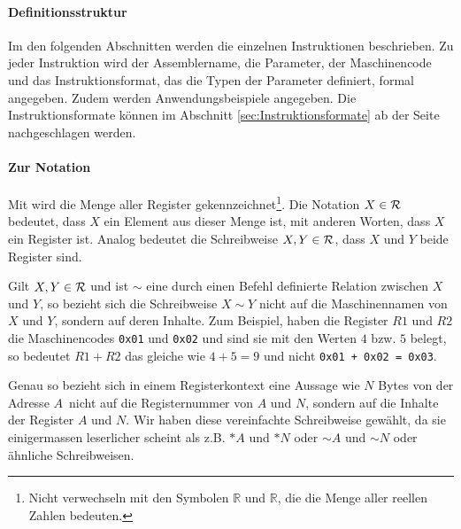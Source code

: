 \paragraph{Definitionsstruktur}
Im den folgenden Abschnitten werden die einzelnen Instruktionen beschrieben. Zu
jeder Instruktion wird der \gls{Assemblername}, die Parameter, der Maschinencode
und das Instruktionsformat, das die Typen der Parameter definiert, formal
angegeben. Zudem werden Anwendungsbeispiele angegeben. Die Instruktionsformate
können im Abschnitt \ref{sec:Instruktionsformate} ab der Seite
\pageref{sec:Instruktionsformate} nachgeschlagen werden.

\paragraph{Zur Notation}
Mit \Reg\index{\Reg} wird die Menge aller Register
gekennzeichnet\footnote{Nicht verwechseln mit den Symbolen $\mathds{R}$ und
$\mathbb{R}$, die die Menge aller reellen Zahlen bedeuten.}.
Die Notation $X \in \mathcal{R}$ bedeutet, dass $X$ ein Element aus dieser Menge ist,
mit anderen Worten, dass $X$ ein Register ist. Analog bedeutet die
Schreibweise $X,Y \in \mathcal{R}$, dass $X$ und $Y$ beide Register sind.

Gilt $X, Y\in \mathcal{R}$ und ist $\sim$ eine durch einen Befehl definierte Relation
zwischen $X$ und $Y$, so bezieht sich die Schreibweise $X \sim Y$ nicht auf die
Maschinennamen von $X$ und $Y$, sondern auf deren Inhalte. Zum Beispiel, haben
die Register $R1$ und $R2$ die Maschinencodes \texttt{0x01} und \texttt{0x02}
und sind sie mit den Werten $4$ bzw. $5$ belegt, so bedeutet $R1 + R2$ das
gleiche wie $4 + 5 = 9$ und nicht \texttt{0x01 + 0x02 = 0x03}.

Genau so bezieht sich in einem Registerkontext eine Aussage wie \glqq $N$ Bytes
von der Adresse $A$\grqq\ nicht auf die Registernummer von $A$ und $N$, sondern
auf die Inhalte der Register $A$ und $N$. Wir haben diese vereinfachte
Schreibweise gewählt, da sie einigermassen leserlicher scheint als z.B. $*A$ und
$*N$ oder $\sim A$ und $\sim N$ oder ähnliche Schreibweisen.

